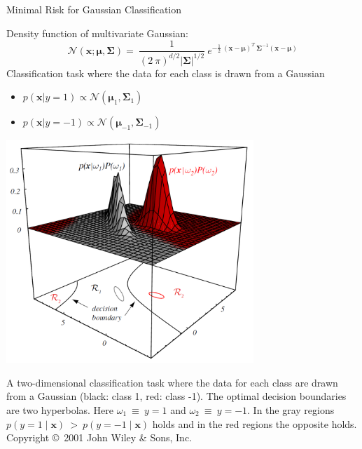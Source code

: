 \documentclass[xcolor=pdftex,dvipsnames,table]{beamer}
\begin{document}
\begin{frame}{Minimal Risk for Gaussian Classification}
	\par
	\scriptsize
	\textcolor{NavyBlue}{Density function of multivariate Gaussian:}
	\begin{equation*}
		 \mathcal{N}(\mathbf{x}; \mathbf{\mu}, \mathbf{\Sigma}) = \ \frac{1}{\left( 2 \ \pi \right)^{d/2} \left| \mathbf{\Sigma} \right|^{1/2}} \ e^{ - \frac{1}{2} \ (\mathbf{x}-\mathbf{\mu})^T \ \mathbf{\Sigma}^{-1} (\mathbf{x}-\mathbf{\mu})}
	\end{equation*}
	\textcolor{NavyBlue}{Classification task where the data for each class is drawn from a Gaussian\\}
	 \begin{itemize}
		\item $p(\mathbf{x} \vert y=1) \propto \mathcal{N} (\mathbf{\mu}_1 , \mathbf{\Sigma}_1 ) $
		\item $p(\mathbf{x} \vert y=-1) \propto \mathcal{N} (\mathbf{\mu}_{-1} , \mathbf{\Sigma}_{-1} ) $
	 \end{itemize}

	 \begin{minipage}{0.7\textwidth}
		 \includegraphics[angle=0,width=0.7\textwidth]{figure2-4.png}
	 \end{minipage}%
	 \begin{minipage}{0.3\textwidth} 
		 \tiny {A two-dimensional
		 classification task where the data for each class are drawn from a
		 Gaussian (black: class 1, red: class -1). The optimal decision
		 boundaries are two hyperbolas. Here $\omega_1 \ \equiv \ y = 1$ and
		 $\omega_2 \ \equiv \ y = -1$. In the gray regions $p(y=1 \mid \mathbf{x}) \
		 > \ p(y=-1 \mid \mathbf{x})$ holds and in the red regions the opposite
		 holds. Copyright \copyright\ 2001 John Wiley \& Sons, Inc.}
	 \end{minipage}
\end{frame}
\end{document}
